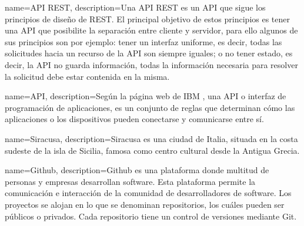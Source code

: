 {
    name=API REST,
    description={Una API REST es un \gls{API} que sigue los principios de diseño de REST. El principal objetivo de estos principios es tener una \gls{API} que posibilite la separación entre cliente y servidor, para ello algunos de sus principios son por ejemplo: tener un interfaz uniforme, es decir, todas las solicitudes hacia un recurso de la API son siempre iguales; o no tener estado, es decir, la API no guarda información, todas la información necesaria para resolver la solicitud debe estar contenida en la misma.}
}

{
    name=API,
    description={Según la página web de IBM \cite{RefWorks:RefID:33-2021-API}, una API o interfaz de programación de aplicaciones, es un conjunto de reglas que determinan cómo las aplicaciones o los dispositivos pueden conectarse y comunicarse entre sí.}
}

{
    name=Siracusa,
    description={Siracusa es una ciudad de Italia, situada en la costa sudeste de la isla de Sicilia, famosa como centro cultural desde la Antigua Grecia.}
}

{
    name=Github,
    description={Github es una plataforma donde multitud de personas y empresas desarrollan software. Esta plataforma permite la comunicación e interacción de la comunidad de desarrolladores de software. Los proyectos se alojan en lo que se denominan repositorios, los cuáles pueden ser públicos o privados. Cada repositorio tiene un control de versiones mediante Git.}
}


